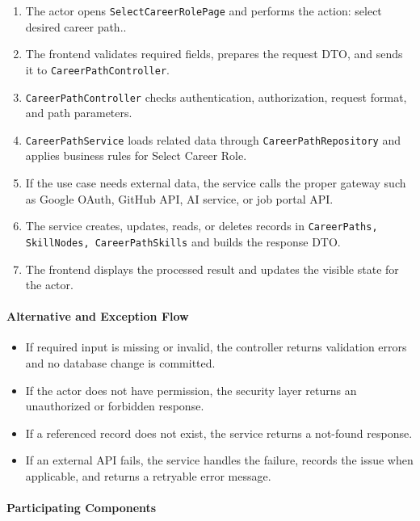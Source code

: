 \begin{enumerate}
    \item The actor opens \texttt{SelectCareerRolePage} and performs the action: select desired career path..
    \item The frontend validates required fields, prepares the request DTO, and sends it to \texttt{CareerPathController}.
    \item \texttt{CareerPathController} checks authentication, authorization, request format, and path parameters.
    \item \texttt{CareerPathService} loads related data through \texttt{CareerPathRepository} and applies business rules for Select Career Role.
    \item If the use case needs external data, the service calls the proper gateway such as Google OAuth, GitHub API, AI service, or job portal API.
    \item The service creates, updates, reads, or deletes records in \texttt{CareerPaths, SkillNodes, CareerPathSkills} and builds the response DTO.
    \item The frontend displays the processed result and updates the visible state for the actor.
\end{enumerate}

\paragraph{Alternative and Exception Flow}

\begin{itemize}
    \item If required input is missing or invalid, the controller returns validation errors and no database change is committed.
    \item If the actor does not have permission, the security layer returns an unauthorized or forbidden response.
    \item If a referenced record does not exist, the service returns a not-found response.
    \item If an external API fails, the service handles the failure, records the issue when applicable, and returns a retryable error message.
\end{itemize}

\paragraph{Participating Components}

